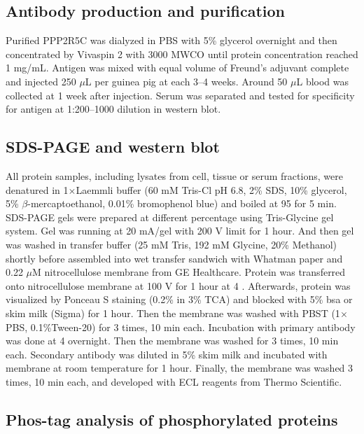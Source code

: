 \subsection{Antibody production and purification}

Purified PPP2R5C was dialyzed in PBS with 5\% glycerol overnight and then concentrated by Vivaspin 2 with 3000 MWCO until protein concentration reached 1 mg/mL. Antigen was mixed with equal volume of Freund's adjuvant complete and injected 250 $\mu$L per guinea pig at each 3--4 weeks. Around 50 $\mu$L blood was collected at 1 week after injection. Serum was separated and tested for specificity for antigen at 1:200--1000 dilution in western blot.

\subsection{SDS-PAGE and western blot}

All protein samples, including lysates from cell, tissue or serum fractions, were denatured in 1$\times$Laemmli buffer (60 mM Tris-Cl pH 6.8, 2\% SDS, 10\% glycerol, 5\% $\beta$-mercaptoethanol, 0.01\% bromophenol blue) and boiled at 95 \celsius{} for 5 min. SDS-PAGE gels were prepared at different percentage using Tris-Glycine gel system. Gel was running at 20 mA/gel with 200 V limit for 1 hour. And then gel was washed in transfer buffer (25 mM Tris, 192 mM Glycine, 20\% Methanol) shortly before assembled into wet transfer sandwich with Whatman paper and 0.22 $\mu$M nitrocellulose membrane from GE Healthcare. Protein was transferred onto nitrocellulose membrane at 100 V for 1 hour at 4 \celsius. Afterwards, protein was visualized by Ponceau S staining (0.2\% in 3\% TCA) and blocked with 5\% \gls{bsa} or skim milk (Sigma) for 1 hour. Then the membrane was washed with PBST (1$\times$PBS, 0.1\%Tween-20) for 3 times, 10 min each. Incubation with primary antibody was done at 4 \celsius{} overnight. Then the membrane was washed for 3 times, 10 min each. Secondary antibody was diluted in 5\% skim milk and incubated with membrane at room temperature for 1 hour. Finally, the membrane was washed 3 times, 10 min each, and developed with ECL reagents from Thermo Scientific.

\subsection{Phos-tag\texorpdfstring{\textsuperscript{\textregistered}}{\textregistered}  analysis of phosphorylated proteins}


